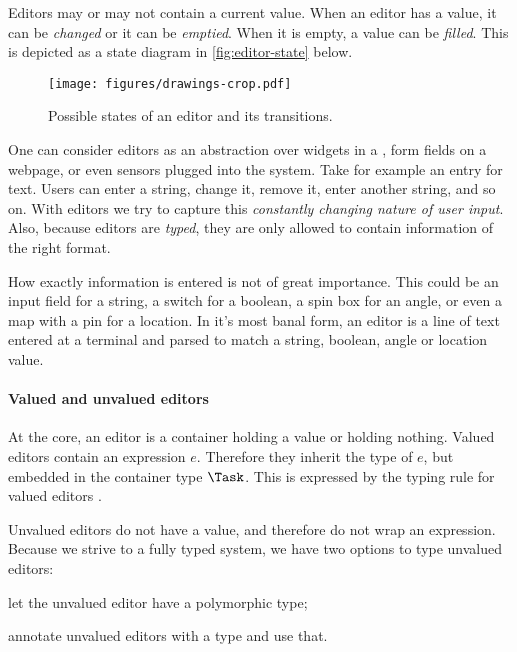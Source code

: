 Editors may or may not contain a current value.
When an editor has a value, it can be \emph{changed} or it can be \emph{emptied}.
When it is empty, a value can be \emph{filled}.
This is depicted as a state diagram in \autoref{fig:editor-state} below.

\begin{figure}[b]
  \centering
  \texttt{[image: figures/drawings-crop.pdf]}
  \caption{Possible states of an editor and its transitions.}
  \label{fig:editor-state}
\end{figure}

One can consider editors as an abstraction over widgets in a \GUI,
form fields on a webpage,
or even sensors plugged into the system.
Take for example an entry for text.
Users can enter a string, change it, remove it, enter another string, and so on.
With editors we try to capture this \emph{constantly changing nature of user input}.
Also, because editors are \emph{typed},
they are only allowed to contain information of the right format.

How exactly information is entered is not of great importance.
This could be an input field for a string,
a switch for a boolean,
a spin box for an angle,
or even a map with a pin for a location.
In it's most banal form,
an editor is a line of text entered at a terminal and parsed to match
a string, boolean, angle or location value.



\paragraph{Valued and unvalued editors}

At the core,
an editor is a container holding a value
or holding nothing.
Valued editors contain an expression $e$.
Therefore they inherit the type of $e$,
but embedded in the container type $\Task$.
This is expressed by the typing rule for valued editors .

Unvalued editors do not have a value,
and therefore do not wrap an expression.
Because we strive to a fully typed system,
we have two options to type unvalued editors:
\begin{enumerate*}
  \item let the unvalued editor have a polymorphic type;
  \item annotate unvalued editors with a type and use that. \label{itm:annotate}
\end{enumerate*}

